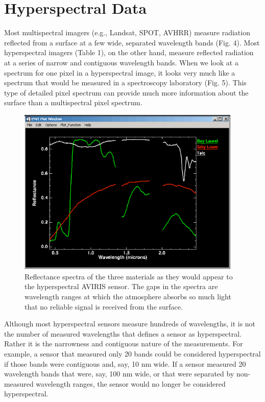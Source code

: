 \documentclass[document.tex]{subfiles}
\begin{document}
\section{Hyperspectral Data}
Most multispectral imagers (e.g., Landsat, SPOT, AVHRR) measure radiation reflected
from a surface at a few wide, separated wavelength bands (Fig. 4). Most hyperspectral
imagers (Table 1), on the other hand, measure reflected radiation at a series of narrow
and contiguous wavelength bands. When we look at a spectrum for one pixel in a
hyperspectral image, it looks very much like a spectrum that would be measured in a
spectroscopy laboratory (Fig. 5). This type of detailed pixel spectrum can provide much
more information about the surface than a multispectral pixel spectrum.
\begin{figure}[H]
	\begin{center}
		\includegraphics[height=8.0cm]{imgs/Atmosphere.png}
	\end{center}
	\caption{Reflectance spectra of the three materials as they would appear to the hyperspectral AVIRIS sensor. The gaps in the spectra are wavelength ranges at which the atmosphere absorbs so much light that no reliable signal is received from the surface.}
	\label{fig: Effect of atmospheric absorbtion over hyperspectral data}
\end{figure}
Although most hyperspectral sensors measure hundreds of wavelengths, it is not the
number of measured wavelengths that defines a sensor as hyperspectral. Rather it is the
narrowness and contiguous nature of the measurements. For example, a sensor that
measured only 20 bands could be considered hyperspectral if those bands were
contiguous and, say, 10 nm wide. If a sensor measured 20 wavelength bands that were,
say, 100 nm wide, or that were separated by non-measured wavelength ranges, the sensor
would no longer be considered hyperspectral.
\end{document}
